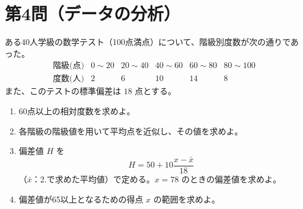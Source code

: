 \documentclass[a4paper,12pt]{jsarticle}
\begin{document}
\section*{第4問（データの分析）}
ある40人学級の数学テスト（100点満点）について、階級別度数が次の通りであった。
\[
\begin{array}{c|ccccc}
\text{階級(点)} & 0\!\sim\!20 & 20\!\sim\!40 & 40\!\sim\!60 & 60\!\sim\!80 & 80\!\sim\!100\\ \hline
\text{度数(人)} & 2 & 6 & 10 & 14 & 8
\end{array}
\]
また、このテストの標準偏差は \(18\) 点とする。
\begin{enumerate}[label=\arabic*.]
  \item 60点以上の相対度数を求めよ。
  \item 各階級の階級値を用いて平均点を近似し、その値を求めよ。
  \item 偏差値 \(H\) を
  \[
  H=50+10\frac{x-\bar{x}}{18}
  \]
  （\(\bar{x}\)：2.で求めた平均値）で定める。\(x=78\) のときの偏差値を求めよ。
  \item 偏差値が65以上となるための得点 \(x\) の範囲を求めよ。
\end{enumerate}
\end{document}
